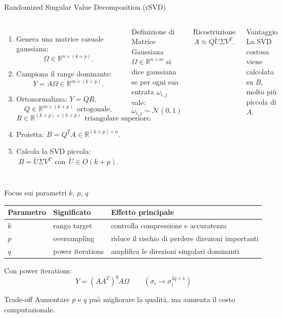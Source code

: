 \documentclass[10pt,aspectratio=169,handout]{beamer}
\begin{document}
\begin{frame}{Randomized Singular Value Decomposition (rSVD)}
\begin{columns}[T]
\begin{enumerate}
  \item Genera una matrice casuale gaussiana:
  \[
  \Omega\in\mathbb{R}^{n\times(k+p)}.
  \]
  \item Campiona il range dominante:
  \[
  Y=A\Omega \in \mathbb{R}^{m\times(k+p)}.
  \]
  \item Ortonormalizza: $Y=QR,$
  \[
  Q \in \mathbb{R}^{m \times (k+p)} \ \ \text{ortogonale},
  \]
  \[
  R\in \mathbb{R}^{(k+p)\times(k+p)} \ \ \text{triangolare superiore}.
  \]
  \item Proietta: $B=Q^TA \in \mathbb{R}^{(k+p)\times n}.$

  \item Calcola la SVD piccola:
  \[
  B=\widetilde U\Sigma V^T \ \ \text{con} \ \ \widetilde U \in O(k+p).
  \]
\end{enumerate}
\begin{block}{Definizione di Matrice Gaussiana}
$\Omega \in \mathbb{R}^{n\times m}$ si dice gaussiana se per ogni sua entrata $\omega_{i,j}$ vale:
\[
\omega_{i,j} \sim \mathcal{N}(0,1)
\]
\end{block}
\begin{block}{Ricostruzione}
\[
A\approx Q\widetilde U\Sigma V^T.
\]
\end{block}
\begin{block}{Vantaggio}
La SVD costosa viene calcolata su $B$, molto più piccola di $A$.
\end{block}
\end{columns}
\end{frame}

\begin{frame}{Focus sui parametri $k$, $p$, $q$}
\begin{table}
\centering
\begin{tabular}{lll}
\toprule
Parametro & Significato & Effetto principale \\
\midrule
$k$ & rango target & controlla compressione e accuratezza \\
$p$ & oversampling & riduce il rischio di perdere direzioni importanti \\
$q$ & power iterations & amplifica le direzioni singolari dominanti \\
\bottomrule
\end{tabular}
\end{table}
\vspace{0.2cm}
Con power iterations:
\[
Y=(AA^T)^qA\Omega \qquad (\sigma_i \rightarrow \sigma_i^{2q+1})
\]
\begin{alertblock}{Trade-off}
Aumentare $p$ e $q$ può migliorare la qualità, ma aumenta il costo computazionale.
\end{alertblock}
\end{frame}
\end{document}
